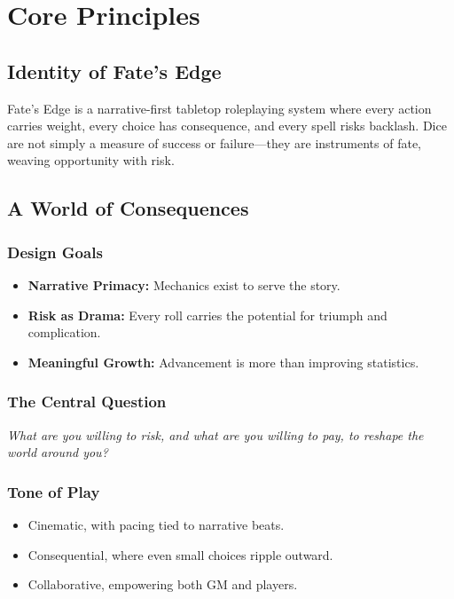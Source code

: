 

\section{Core Principles}

\subsection{Identity of Fate's Edge}
Fate's Edge is a narrative-first tabletop roleplaying system where every action carries weight, every choice has consequence, and every spell risks backlash. Dice are not simply a measure of success or failure---they are instruments of fate, weaving opportunity with risk.

\subsection{A World of Consequences}

\subsubsection{Design Goals}
\begin{itemize}
  \item \textbf{Narrative Primacy:} Mechanics exist to serve the story.
  \item \textbf{Risk as Drama:} Every roll carries the potential for triumph and complication.
  \item \textbf{Meaningful Growth:} Advancement is more than improving statistics.
\end{itemize}

\subsubsection{The Central Question}
\emph{What are you willing to risk, and what are you willing to pay, to reshape the world around you?}

\subsubsection{Tone of Play}
\begin{itemize}
  \item Cinematic, with pacing tied to narrative beats.
  \item Consequential, where even small choices ripple outward.
  \item Collaborative, empowering both GM and players.
\end{itemize}

